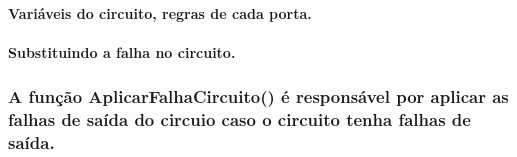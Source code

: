 \documentclass[11pt]{article}
\begin{document}
    \paragraph{Variáveis do circuito, regras de cada
porta.}\label{variuxe1veis-do-circuito-regras-de-cada-porta.}

\paragraph{Substituindo a falha no
circuito.}\label{substituindo-a-falha-no-circuito.}

\subsubsection{A função AplicarFalhaCircuito() é responsável por aplicar
as falhas de saída do circuio caso o circuito tenha falhas de
saída.}\label{a-funuxe7uxe3o-aplicarfalhacircuito-uxe9-responsuxe1vel-por-aplicar-as-falhas-de-sauxedda-do-circuio-caso-o-circuito-tenha-falhas-de-sauxedda.}
\end{document}
